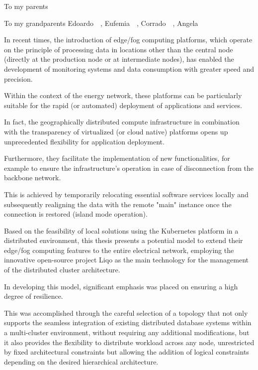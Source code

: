 \documentclass[%
	corpo=11pt,
    twoside,
    stile=classica,
    oldstyle,
    tipotesi=custom,
    greek,
    evenboxes,
]{toptesi}
\begin{document}
\english


\ifclassica%
{\begin{dedica}
    To my parents

    To my grandparents Edoardo~\textdagger\ ,  Eufemia~\textdagger\ , Corrado~\textdagger\ , Angela
\end{dedica}

\sommario%
In recent times, the introduction of edge/fog computing platforms, which operate on the principle of processing data in locations other than the central node (directly at the production node or at intermediate nodes), has enabled the development of monitoring systems and data consumption with greater speed and precision.

Within the context of the energy network, these platforms can be particularly suitable for the rapid (or automated) deployment of applications and services.

In fact, the geographically distributed compute infrastructure in combination with the transparency of virtualized (or cloud native) platforms opens up unprecedented flexibility for application deployment. 

Furthermore, they facilitate the implementation of new functionalities, for example to ensure the infrastructure's operation in case of disconnection from the backbone network. 

This is achieved by temporarily relocating essential software services locally and subsequently realigning the data with the remote "main" instance once the connection is restored (island mode operation). 

Based on the feasibility of local solutions using the Kubernetes platform in a distributed environment, this thesis presents a potential model to extend their edge/fog computing features to the entire electrical network, employing the innovative open-source project Liqo as the main technology for the management of the distributed cluster architecture.

In developing this model, significant emphasis was placed on ensuring a high degree of resilience. 

This was accomplished through the careful selection of a topology that not only supports the seamless integration of existing distributed database systems within a multi-cluster environment, without requiring any additional modifications, but it also provides the flexibility to distribute workload across any node, unrestricted by fixed architectural constraints but allowing the addition of logical constraints depending on the desired hierarchical architecture.

}
\end{document}
